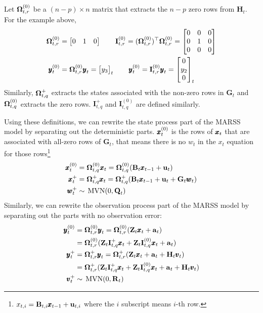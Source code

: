 \documentclass[]{article}
\def\OMG{\mbox{\boldmath $\Omega$}}
\def\ZZ{\mbox{$\mathbf Z$}}	\def\zz{\mbox{$\mathbf z$}}
\def\BB{\mbox{$\mathbf B$}}	\def\bb{\mbox{$\mathbf b$}}
\def\GG{\mbox{$\mathbf G$}}	\def\gg{\mbox{$\mathbf g$}}
\def\HH{\mbox{$\mathbf H$}}	\def\hh{\mbox{$\mathbf h$}}
\def\II{\mbox{$\mathbf I$}} \def\ii{\mbox{$\mathbf i$}}
\def\QQ{\mbox{$\mathbf Q$}}	 \def\qq{\mbox{$\mathbf q$}}
\def\RR{\mbox{$\mathbf R$}}	 \def\rr{\mbox{$\mathbf r$}}
\def\MVN{\,\textup{\textrm{MVN}}}
\begin{document}
Let $\OMG_{t,r}^{(0)}$ be a $(n-p) \times n$  matrix that extracts the $n-p$ zero rows from $\HH_t$. For the example above, 
\begin{equation}
\begin{split}
\OMG_{t,r}^{(0)} &= 
\begin{bmatrix}
0&1&0\\
\end{bmatrix}\quad\quad
\II_{t,r}^{(0)} = (\OMG_{t,r}^{(0)})^\top\OMG_{t,r}^{(0)} = 
\begin{bmatrix}
0&0&0\\
0&1&0\\
0&0&0
\end{bmatrix}
\\
\yy_t^{(0)}&=\OMG_{t,r}^{(0)} \yy_t = \begin{bmatrix}
y_3
\end{bmatrix}_t\quad\quad
\yy_t^{(0)}=\II_{t,r}^{(0)} \yy_t = \begin{bmatrix}
0\\
y_2\\
0
\end{bmatrix}_t
\end{split}
\end{equation}
Similarly,  $\OMG_{t,q}^+$ extracts the states associated with the non-zero rows in $\GG_t$ and  $\OMG_{t,q}^{(0)}$ extracts the zero rows.  $\II_{t,q}^+$ and $\II_{t,q}^{(0)}$ are defined similarly.

Using these definitions, we can rewrite the state process part of the MARSS model by separating out the deterministic parts. $\mbox{$\pmb{x}$}_t^{(0)}$ is the rows of $\mbox{$\pmb{x}$}_t$ that are associated with all-zero rows of $\GG_t$, that means there is no $w_t$ in the $x_t$ equation for those rows\footnote{$x_{t,i}=\BB_{t,i}\xx_{t-1} + \uu_{t,i}$ where the $i$ subscript means $i$-th row.}
\begin{equation}\label{eq:degen.model.x1}
\begin{split}
\xx_t^{(0)}&=\OMG_{t,q}^{(0)}\xx_t=\OMG_{t,q}^{(0)}(\BB_t\xx_{t-1} + \uu_t)\\
\xx_t^+&=\OMG_{t,q}^+\xx_t=\OMG_{t,q}^+(\BB_t\xx_{t-1} + \uu_t + \GG_t\ww_t)\\
\ww_t^+ &\sim \MVN(0,\QQ_t)
\end{split}
\end{equation}
Similarly, we can rewrite the observation process part of the MARSS model by separating out the parts with no observation error:
\begin{equation}\label{eq:degen.model.y1}
\begin{split}
\yy_t^{(0)}&=\OMG_{t,r}^{(0)}\yy_t=\OMG_{t,r}^{(0)}(\ZZ_t\xx_t + \aa_t) \\
&=\OMG_{t,r}^{(0)}(\ZZ_t\II_{t,q}^+\xx_t + \ZZ_t\II_{t,q}^{(0)}\xx_t + \aa_t)\\
\yy_t^+&=\OMG_{t,r}^+\yy_t=\OMG_{t,r}^+(\ZZ_t\xx_t + \aa_t + \HH_t\vv_t)\\
&=\OMG_{t,r}^+(\ZZ_t\II_{t,q}^+\xx_t + \ZZ_t\II_{t,q}^{(0)}\xx_t + \aa_t+\HH_t\vv_t)\\
\vv_t^+ &\sim \MVN(0,\RR_t)
\end{split}
\end{equation}
\end{document}
